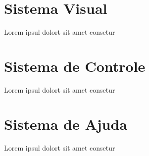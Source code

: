
\section{Sistema Visual}

Lorem ipsul dolort sit amet consetur


\section{Sistema de Controle}

Lorem ipsul dolort sit amet consetur

\section{Sistema de Ajuda}

Lorem ipsul dolort sit amet consetur